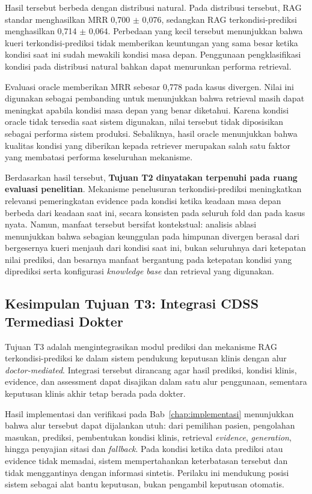 Hasil tersebut berbeda dengan distribusi natural. Pada distribusi tersebut, RAG standar menghasilkan MRR 0,700 $\pm$ 0,076, sedangkan RAG
terkondisi-prediksi menghasilkan 0,714 $\pm$ 0,064. Perbedaan yang kecil tersebut menunjukkan bahwa kueri terkondisi-prediksi tidak memberikan keuntungan
yang sama besar ketika kondisi saat ini sudah mewakili kondisi masa depan. Penggunaan pengklasifikasi kondisi pada distribusi natural
bahkan dapat menurunkan performa retrieval.

Evaluasi oracle memberikan MRR sebesar 0,778 pada kasus divergen. Nilai ini digunakan sebagai pembanding untuk menunjukkan bahwa retrieval masih dapat
meningkat apabila kondisi masa depan yang benar diketahui. Karena kondisi oracle tidak tersedia saat sistem digunakan, nilai tersebut tidak
diposisikan sebagai performa sistem produksi. Sebaliknya, hasil oracle menunjukkan bahwa kualitas kondisi yang diberikan kepada retriever merupakan
salah satu faktor yang membatasi performa keseluruhan mekanisme.

Berdasarkan hasil tersebut, \textbf{Tujuan T2 dinyatakan terpenuhi pada ruang evaluasi penelitian}. Mekanisme penelusuran terkondisi-prediksi meningkatkan
relevansi pemeringkatan evidence pada kondisi ketika keadaan masa depan berbeda dari keadaan saat ini, secara konsisten pada seluruh fold dan pada kasus
nyata. Namun, manfaat tersebut bersifat kontekstual: analisis ablasi menunjukkan bahwa sebagian keunggulan pada himpunan divergen berasal dari bergesernya
kueri menjauh dari kondisi saat ini, bukan seluruhnya dari ketepatan nilai prediksi, dan besarnya manfaat bergantung pada ketepatan kondisi yang diprediksi
serta konfigurasi \textit{knowledge base} dan retrieval yang digunakan.

\subsection{Kesimpulan Tujuan T3: Integrasi CDSS Termediasi Dokter}
\label{subsec:bab7-kesimpulan-t3}

Tujuan T3 adalah mengintegrasikan modul prediksi dan mekanisme RAG terkondisi-prediksi ke dalam sistem pendukung keputusan klinis dengan alur
\textit{doctor-mediated}. Integrasi tersebut dirancang agar hasil prediksi, kondisi klinis, evidence, dan assessment dapat disajikan dalam satu
alur penggunaan, sementara keputusan klinis akhir tetap berada pada dokter.

Hasil implementasi dan verifikasi pada Bab~\ref{chap:implementasi} menunjukkan bahwa alur tersebut dapat dijalankan utuh: dari pemilihan pasien, pengolahan
masukan, prediksi, pembentukan kondisi klinis, retrieval \textit{evidence}, \textit{generation}, hingga penyajian sitasi dan \textit{fallback}. Pada kondisi ketika data prediksi atau
evidence tidak memadai, sistem mempertahankan keterbatasan tersebut dan tidak menggantinya dengan informasi sintetis. Perilaku ini mendukung posisi
sistem sebagai alat bantu keputusan, bukan pengambil keputusan otomatis.

